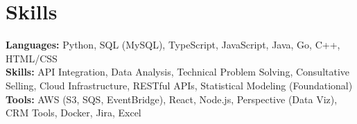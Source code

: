 \documentclass[11pt]{article}       %
\begin{document}
\vspace{-18.5pt}


\section*{Skills}
\textbf{Languages:} Python, SQL (MySQL), TypeScript, JavaScript, Java, Go, C++, HTML/CSS\\
\textbf{Skills:} API Integration, Data Analysis, Technical Problem Solving, Consultative Selling, Cloud Infrastructure, RESTful APIs, Statistical Modeling (Foundational)\\
\textbf{Tools:} AWS (S3, SQS, EventBridge), React, Node.js, Perspective (Data Viz), CRM Tools, Docker, Jira, Excel\\

\vspace{-6.5pt}
\end{document}
